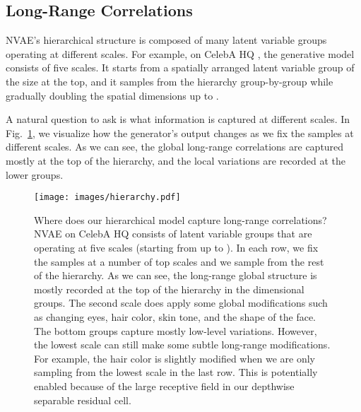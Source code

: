 \documentclass{article}
\begin{document}
\subsection{Long-Range Correlations}\label{app:scales}
NVAE's hierarchical structure is composed of many latent variable groups operating at different scales. For example, on CelebA HQ , the generative model consists of five scales. It starts from a spatially arranged latent variable group of the size  at the top, and it samples from the hierarchy group-by-group while gradually doubling the spatial dimensions up to . 

A natural question to ask is what information is captured at different scales. In Fig.~\ref{fig:scales}, we visualize how the generator's output changes as we fix the samples at different scales. As we can see, the global long-range correlations are captured mostly at the top of the hierarchy, and the local variations are recorded at the lower groups.

\begin{figure}[!h]
\centering
\texttt{[image: images/hierarchy.pdf]}
\caption{Where does our hierarchical model capture long-range correlations? NVAE on CelebA HQ consists of latent variable groups that are operating at five scales (starting from  up to ). In each row, we fix the samples at a number of top scales and we sample from the rest of the hierarchy. As we can see, the long-range global structure is mostly recorded at the top of the hierarchy in the  dimensional groups. The second scale does apply some global modifications such as changing eyes, hair color, skin tone, and the shape of the face. The bottom groups capture mostly low-level variations. However, the lowest scale can still make some subtle long-range modifications. For example, the hair color is slightly modified when we are only sampling from the lowest scale in the last row. This is potentially enabled because of the large receptive field in our depthwise separable residual cell.}
\label{fig:scales}
\vspace{-0.3cm}
\end{figure}  
\end{document}
